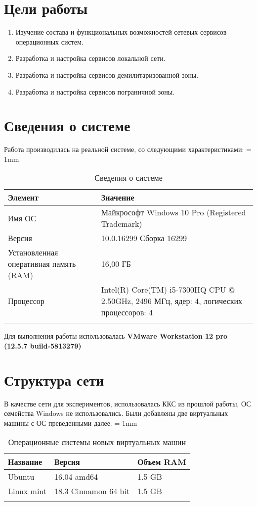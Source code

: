 \documentclass[a4paper, 12pt]{article}		%
\begin{document}


%
\section{Цели работы}
\begin{enumerate}
\item Изучение состава и функциональных возможностей сетевых сервисов операционных систем.
\item Разработка и настройка сервисов локальной сети.
\item Разработка и настройка сервисов демилитаризованной зоны.
\item Разработка и настройка сервисов пограничной зоны.
\end{enumerate}

\section{Сведения о системе}
Работа производилась на реальной системе, со следующими характеристиками:
\tabulinesep = 1mm
\begin{longtabu} to \textwidth {|X[15, c , m ] |X[25, c , m ] | }\firsthline\hline

\textbf{Элемент}&\textbf{Значение}\\ \hline \endfirsthead
	
Имя ОС&Майкрософт Windows 10 Pro (Registered Trademark)\\ \hline
Версия&10.0.16299 Сборка 16299\\ \hline
Установленная оперативная память (RAM) &16,00 ГБ\\ \hline
Процессор&Intel(R) Core(TM) i5-7300HQ CPU @ 2.50GHz, 2496 МГц, ядер: 4, логических процессоров: 4\\ \hline
\caption{Сведения о системе}
\end{longtabu}
Для выполнения работы использовалась \textbf{VMware Workstation 12 pro (12.5.7 build-5813279)}



\section{Структура сети}
В качестве сети для экспериментов, использовалась ККС из прошлой работы, ОС семейства Windows не использовались. Были добавлены две виртуальных машины с ОС преведенными далее.
\tabulinesep = 1mm
\begin{longtabu} to \textwidth {|X[ c , m ] |X[2, c , m ] | X[ c , m ]|}\firsthline\hline
\textbf{Название}&\textbf{Версия}&\textbf{Объем RAM}\\ \hline \endfirsthead
Ubuntu&16.04 amd64&1.5 GB\\ \hline
Linux mint&18.3 Cinnamon 64 bit&1.5 GB\\ \hline
\caption{Операционные системы новых виртуальных машин}
\end{longtabu}
\end{document}
